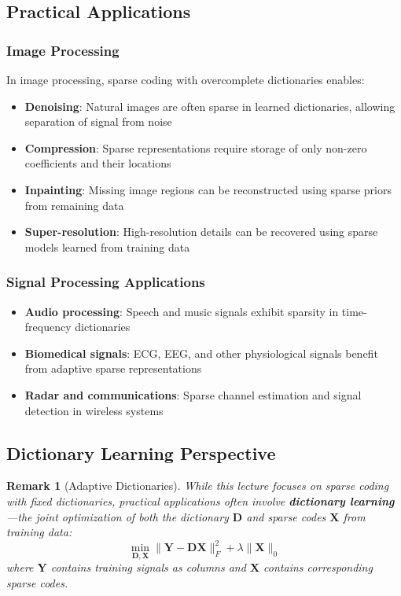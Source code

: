 \documentclass[12pt]{article}
\newtheorem{remark}[theorem]{Remark}
\begin{document}
\subsection{Practical Applications}

\subsubsection{Image Processing}

In image processing, sparse coding with overcomplete dictionaries enables:
\begin{itemize}
    \item \textbf{Denoising}: Natural images are often sparse in learned dictionaries, allowing separation of signal from noise
    \item \textbf{Compression}: Sparse representations require storage of only non-zero coefficients and their locations
    \item \textbf{Inpainting}: Missing image regions can be reconstructed using sparse priors from remaining data
    \item \textbf{Super-resolution}: High-resolution details can be recovered using sparse models learned from training data
\end{itemize}

\subsubsection{Signal Processing Applications}

\begin{itemize}
    \item \textbf{Audio processing}: Speech and music signals exhibit sparsity in time-frequency dictionaries
    \item \textbf{Biomedical signals}: ECG, EEG, and other physiological signals benefit from adaptive sparse representations
    \item \textbf{Radar and communications}: Sparse channel estimation and signal detection in wireless systems
\end{itemize}

\subsection{Dictionary Learning Perspective}

\begin{remark}[Adaptive Dictionaries]
    While this lecture focuses on sparse coding with fixed dictionaries, practical applications often involve \textbf{dictionary learning}—the joint optimization of both the dictionary $\mathbf{D}$ and sparse codes $\mathbf{X}$ from training data:
    \begin{equation}
        \min_{\mathbf{D}, \mathbf{X}} \|\mathbf{Y} - \mathbf{D}\mathbf{X}\|_F^2 + \lambda \|\mathbf{X}\|_0
    \end{equation}
    where $\mathbf{Y}$ contains training signals as columns and $\mathbf{X}$ contains corresponding sparse codes.
\end{remark}
\end{document}
